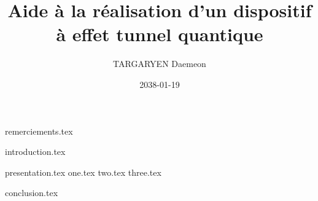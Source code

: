\documentclass{rUTT}
\date{2038-01-19}
\author{{\sc TARGARYEN} Daemeon
}
\title{Aide à la réalisation d'un dispositif à effet tunnel quantique}
\begin{document}

    \frontpageSTB %

    {
        \myILB
    }


    \pagestyle{UTT} %
    \justifying %


    {remerciements.tex} %

    \clearpage


    {
        \setcounter{tocdepth}{1}
        \renewcommand{\contentsname}{Sommaire}
        \tableofcontents
    }

    \clearpage

    {

        \listoffigures

        \listoftables
    }


    \clearpage


    {introduction.tex}

    \clearpage

    {presentation.tex}
    {one.tex}
    {two.tex}
    {three.tex}

    \clearpage

    {conclusion.tex}
    \label{LastPage}

    \clearpage
\end{document}
